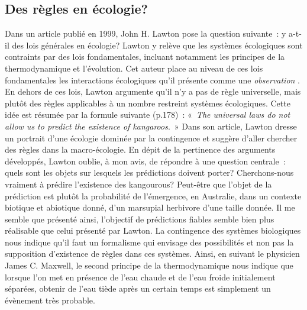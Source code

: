 \subsection*{Des règles en
écologie?}\label{des-ruxe8gles-en-uxe9cologie}

Dans un article publié en 1999, John H. Lawton pose la question
suivante~: y a-t-il des lois générales en écologie? Lawton y relève que
les systèmes écologiques sont contraints par des lois fondamentales,
incluant notamment les principes de la thermodynamique et l'évolution.
Cet auteur place au niveau de ces lois fondamentales les interactions
écologiques qu'il présente comme une \emph{observation} \citep[selon ces
mots,][]{Lawton1999}. En dehors de ces lois, Lawton argumente qu'il n'y
a pas de règle universelle, mais plutôt des règles applicables à un
nombre restreint systèmes écologiques. Cette idée est résumée par la
formule suivante (p.178)~: «~\emph{The universal laws do not allow us to
predict the existence of kangaroos}.~» Dans son article, Lawton dresse
un portrait d'une écologie dominée par la contingence et suggère d'aller
chercher des règles dans la macro-écologie. En dépit de la pertinence
des arguments développés, Lawton oublie, à mon avis, de répondre à une
question centrale~: quels sont les objets sur lesquels les prédictions
doivent porter? Cherchons-nous vraiment à prédire l'existence des
kangourous? Peut-être que l'objet de la prédiction est plutôt la
probabilité de l'émergence, en Australie, dans un contexte biotique et
abiotique donné, d'un marsupial herbivore d'une taille donnée. Il me
semble que présenté ainsi, l'objectif de prédictions fiables semble bien
plus réalisable que celui présenté par Lawton. La contingence des
systèmes biologiques nous indique qu'il faut un formalisme qui envisage
des possibilités et non pas la supposition d'existence de règles dans
ces systèmes. Ainsi, en suivant le physicien James C. Maxwell, le second
principe de la thermodynamique nous indique que lorsque l'on met en
présence de l'eau chaude et de l'eau froide initialement séparées,
obtenir de l'eau tiède après un certain temps est simplement un
évènement très probable.

